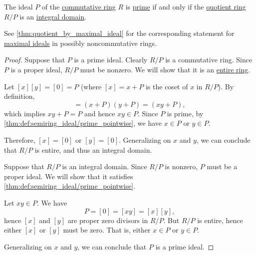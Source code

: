 \begin{proposition}\label{thm:quotient_by_prime_ideal}
  The ideal \( P \) of the \hyperref[def:ring/commutative]{commutative ring} \( R \) is \hyperref[def:semiring_ideal/prime]{prime} if and only if the \hyperref[def:ring/quotient]{quotient ring} \( R / P \) is an \hyperref[def:integral_domain]{integral domain}.
\end{proposition}
\begin{comments}
  \item See \cref{thm:quotient_by_maximal_ideal} for the corresponding statement for \hyperref[def:semiring_ideal/maximal]{maximal ideals} in possibly noncommutative rings.
\end{comments}
\begin{proof}
  \SufficiencySubProof Suppose that \( P \) is a prime ideal. Clearly \( R / P \) is a commutative ring. Since \( P \) is a proper ideal, \( R / P \) must be nonzero. We will show that it is an \hyperref[def:entire_semiring]{entire ring}.

  Let \( [x] [y] = [0] = P \) (where \( [x] = x + P \) is the coset of \( x \) in \( R / P \)). By definition,
  \begin{equation*}
    [x] [y] = (x + P) (y + P) = (xy + P),
  \end{equation*}
  which implies \( xy + P = P \) and hence \( xy \in P \). Since \( P \) is prime, by \cref{thm:def:semiring_ideal/prime_pointwise}, we have \( x \in P \) or \( y \in P \).

  Therefore, \( [x] = [0] \) or \( [y] = [0] \). Generalizing on \( x \) and \( y \), we can conclude that \( R / P \) is entire, and thus an integral domain.

  \NecessitySubProof Suppose that \( R / P \) is an integral domain. Since \( R / P \) is nonzero, \( P \) must be a proper ideal. We will show that it satisfies \cref{thm:def:semiring_ideal/prime_pointwise}.

  Let \( xy \in P \). We have
  \begin{equation*}
    P = [0] = [xy] = [x] [y],
  \end{equation*}
  hence \( [x] \) and \( [y] \) are proper zero divisors in \( R / P \). But \( R / P \) is entire, hence either \( [x] \) or \( [y] \) must be zero. That is, either \( x \in P \) or \( y \in P \).

  Generalizing on \( x \) and \( y \), we can conclude that \( P \) is a prime ideal.
\end{proof}

